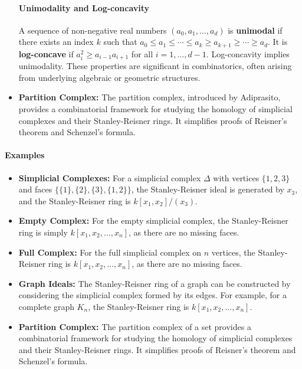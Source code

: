 \documentclass[12pt]{article}
\theoremstyle{definition}
\numberwithin{equation}{subsection}
\begin{document}
\begin{itemize}
\paragraph{Unimodality and Log-concavity}
A sequence of non-negative real numbers $(a_0, a_1, \ldots, a_d)$ is \textbf{unimodal} if there exists an index $k$ such that $a_0 \le a_1 \le \cdots \le a_k \ge a_{k+1} \ge \cdots \ge a_d$. It is \textbf{log-concave} if $a_i^2 \ge a_{i-1}a_{i+1}$ for all $i=1, \ldots, d-1$. Log-concavity implies unimodality. These properties are significant in combinatorics, often arising from underlying algebraic or geometric structures.

\item \textbf{Partition Complex:} The partition complex, introduced by Adiprasito, provides a combinatorial framework for studying the homology of simplicial complexes and their Stanley-Reisner rings. It simplifies proofs of Reisner's theorem and Schenzel's formula.
\end{itemize}
\paragraph{Examples}
\begin{itemize}
\item \textbf{Simplicial Complexes:} For a simplicial complex $\Delta$ with vertices $\{1, 2, 3\}$ and faces $\{\{1\}, \{2\}, \{3\}, \{1, 2\}\}$, the Stanley-Reisner ideal is generated by $x_3$, and the Stanley-Reisner ring is $k[x_1, x_2]/(x_3)$.
\item \textbf{Empty Complex:} For the empty simplicial complex, the Stanley-Reisner ring is simply $k[x_1, x_2, \ldots, x_n]$, as there are no missing faces.
\item \textbf{Full Complex:} For the full simplicial complex on $n$ vertices, the Stanley-Reisner ring is $k[x_1, x_2, \ldots, x_n]$, as there are no missing faces.
\item \textbf{Graph Ideals:} The Stanley-Reisner ring of a graph can be constructed by considering the simplicial complex formed by its edges. For example, for a complete graph $K_n$, the Stanley-Reisner ring is $k[x_1, x_2, \ldots, x_n]$.
\item \textbf{Partition Complex:} The partition complex of a set provides a combinatorial framework for studying the homology of simplicial complexes and their Stanley-Reisner rings. It simplifies proofs of Reisner's theorem and Schenzel's formula.
\end{itemize}
\end{document}
